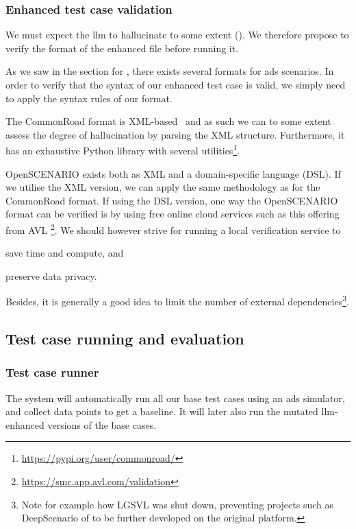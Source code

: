 \subsubsection{Enhanced test case validation}

We must expect the \acrshort{llm} to hallucinate to some extent (). We
therefore propose to verify the format of the enhanced file before running it.

As we saw in the section for , there exists several formats for
\acrshort{ads} scenarios. In order to verify that the syntax of our enhanced test
case is valid, we simply need to apply the syntax rules of our format.

The CommonRoad format is XML-based~\cite[720]{commonRoadOG} and as such we can
to some extent assess the degree of hallucination by parsing the XML structure.
Furthermore, it has an exhaustive Python library with several utilities\footnote{\url{https://pypi.org/user/commonroad/}}.

OpenSCENARIO exists both as XML and a domain-specific language (DSL). If we
utilise the XML version, we can apply the same methodology as for the CommonRoad
format. If using the DSL version, one way
the OpenSCENARIO format can be verified is by using free
online cloud services such as this offering from AVL
\footnote{\url{https://smc.app.avl.com/validation}}. We should however strive for
running a local verification service to \begin{inparaenum}
    \item save time and compute,
    and
    \item preserve data privacy.
\end{inparaenum}
Besides, it is generally a good idea to limit the number of external dependencies\footnote{Note for
    example how LGSVL\cite{lgsvl} was shut down, preventing projects such as DeepScenario of
    \citeauthor{DeepScenario} to be further developed on the original platform.}.

\subsection{Test case running and evaluation}

\subsubsection{Test case runner}

The system will automatically run all
our base test cases using an \acrshort{ads} simulator, and collect data points to get a baseline. It
will later also run the mutated \acrshort{llm}-enhanced versions of the base cases.

